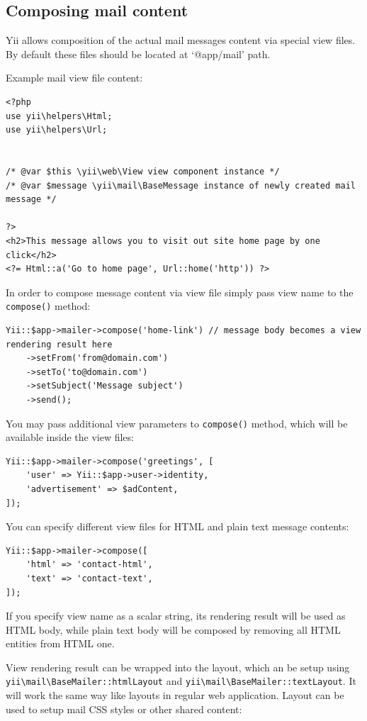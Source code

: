 \subsection{Composing mail content}
Yii allows composition of the actual mail messages content via special view files.
By default these files should be located at `@app/mail' path.

Example mail view file content:

\lstset{language=php}\begin{lstlisting}
<?php
use yii\helpers\Html;
use yii\helpers\Url;


/* @var $this \yii\web\View view component instance */
/* @var $message \yii\mail\BaseMessage instance of newly created mail message */

?>
<h2>This message allows you to visit out site home page by one click</h2>
<?= Html::a('Go to home page', Url::home('http')) ?>
\end{lstlisting}
In order to compose message content via view file simply pass view name to the \lstinline|compose()| method:

\lstset{language=php}\begin{lstlisting}
Yii::$app->mailer->compose('home-link') // message body becomes a view rendering result here
    ->setFrom('from@domain.com')
    ->setTo('to@domain.com')
    ->setSubject('Message subject')
    ->send();
\end{lstlisting}
You may pass additional view parameters to \lstinline|compose()| method, which will be available inside the view files:

\lstset{language=php}\begin{lstlisting}
Yii::$app->mailer->compose('greetings', [
    'user' => Yii::$app->user->identity,
    'advertisement' => $adContent,
]);
\end{lstlisting}
You can specify different view files for HTML and plain text message contents:

\lstset{language=php}\begin{lstlisting}
Yii::$app->mailer->compose([
    'html' => 'contact-html',
    'text' => 'contact-text',
]);
\end{lstlisting}
If you specify view name as a scalar string, its rendering result will be used as HTML body, while
plain text body will be composed by removing all HTML entities from HTML one.

View rendering result can be wrapped into the layout, which an be setup using \texttt{yii{\allowbreak{}\textbackslash}mail{\allowbreak{}\textbackslash}BaseMailer\allowbreak{}::\allowbreak{}htmlLayout}
and \texttt{yii{\allowbreak{}\textbackslash}mail{\allowbreak{}\textbackslash}BaseMailer\allowbreak{}::\allowbreak{}textLayout}. It will work the same way like layouts in regular web application.
Layout can be used to setup mail CSS styles or other shared content:

